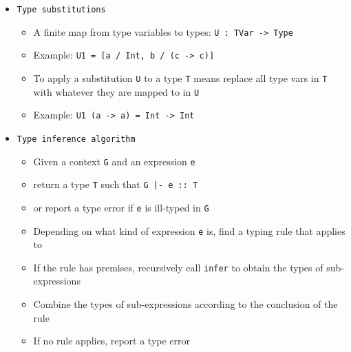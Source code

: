 \documentclass[landscape,8pt]{extarticle}
\newcommand{\code}{\lstinline}
\begin{document}
\begin{multicols}{3}
\begin{itemize}
\begin{itemize}
\begin{itemize}
                            \item So the type of \code{\x -> x} comes out as \code{a -> a}
                            \item We can \code{generalize} this type to \code{forall a . a -> a}
                            \item When we apply \code{id} the first time we \emph{instantiate} this polymorphic type with \code{Int}
                            \item When we apply \code{id} the second time we \emph{instantiate} this polymorphic type with \code{Int -> Int}
                        \end{itemize}
                        \item \code{Type substitutions}
                        \begin{itemize}
                            \item A finite map from type variables to types: \code{U : TVar -> Type}
                            \item Example: \code{U1 = [a / Int, b / (c -> c)]}
                            \item To apply a substitution \code{U} to a type \code{T} means replace all type vars in \code{T} with whatever they are mapped to in \code{U}
                            \item Example: \code{U1 (a -> a) = Int -> Int}
                        \end{itemize}
                        \item \code{Type inference algorithm}
                        \begin{itemize}
                            \item Given a context \code{G} and an expression \code{e}
                            \item return a type \code{T} such that \code{G |- e :: T}
                            \item or report a type error if \code{e} is ill-typed in \code{G}
                            \item Depending on what kind of expression \code{e} is, find a typing rule that applies to
                            \item If the rule has premises, recursively call \code{infer} to obtain the types of sub-expressions
                            \item Combine the types of sub-expressions according to the conclusion of the rule
                            \item If no rule applies, report a type error

\end{itemize}
\end{itemize}
\end{itemize}
\end{multicols}
\end{document}
